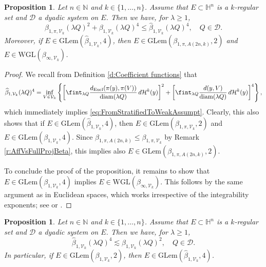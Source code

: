 \documentclass[12pt]{amsart}
\newcommand{\diam}{{\rm diam}}
\numberwithin{equation}{section}
\theoremstyle{plain}
\newtheorem{proposition}[theorem]{Proposition}
\theoremstyle{definition}
\theoremstyle{remark}
\begin{document}
\begin{proposition}\label{p:FromStratifiedToWeakAssumpt}
    Let $n\in \mathbb{N}$ and $k\in \{1,\ldots,n\}$. Assume that $E\subset \mathbb{H}^n$ is a $k$-regular set and $\mathcal{D}$ a dyadic system on $E$. Then we have, for $\lambda \geq 1$,
    \begin{equation}\label{eq:FromStratifiedToWeakAssumpt}
   \beta_{1,\pi,\mathcal{V}_k}(\lambda Q)^2 +\beta_{1,\mathcal{V}_k}(\lambda Q)^4 \leq      \widehat{\beta}_{1,\mathcal{V}_k}(\lambda Q)^4,\quad Q\in \mathcal{D}.
    \end{equation}
   Moreover, if $E\in \mathrm{GLem}(\widehat{\beta}_{1,\mathcal{V}_k},4)$, then $E\in \mathrm{GLem}(\beta_{1,\pi,A(2n,k)},2)$ and $E\in \mathrm{WGL}(\beta_{\infty,\mathcal{V}_k})$.
\end{proposition}


\begin{proof}
We recall from Definition \ref{d:Coefficient functions} that
\begin{displaymath}
    \widehat{\beta}_{1,\mathcal{V}_k}(\lambda Q)^4=\inf_{V\in\mathcal V_k}\left\{\left[\fint_{\lambda Q}\frac{d_{\mathrm{Eucl}}(\pi(y),\pi(V))}{\diam (\lambda Q)}\,d\mathcal{H}^k(y)\right]^{2}+\left[\fint_{\lambda Q}\frac{d(y,V)}{\diam (\lambda Q)}\,d\mathcal{H}^k(y)\right]^{4}\right\},
\end{displaymath}
which immediately implies \eqref{eq:FromStratifiedToWeakAssumpt}. Clearly, this also shows that if $E\in \mathrm{GLem}(\widehat{\beta}_{1,\mathcal{V}_k},4)$, then $E\in \mathrm{GLem}(\beta_{1,\pi,\mathcal{V}_k},2)$ and $E\in \mathrm{GLem}(\beta_{1,\mathcal{V}_k},4)$. Since $\beta_{1,\pi,A(2n,k)}\leq \beta_{1,\pi,\mathcal{V}_k}$ by Remark \ref{r:AffVsFullProjBeta}, this implies also  $E\in \mathrm{GLem}(\beta_{1,\pi,A(2n,k)},2)$.

To conclude the proof of the proposition, it remains to show that $E\in \mathrm{GLem}(\beta_{1,\mathcal{V}_k},4)$ implies $E\in \mathrm{WGL}(\beta_{\infty,\mathcal{V}_k})$. This follows by the same argument as in Euclidean spaces, which works irrespective of the integrability exponents; see \cite[p.27]{David1} or \cite[p.27]{David2}.
\end{proof}

\begin{proposition}\label{p:FromHorizToStartif}
    Let $n\in \mathbb{N}$ and $k\in \{1,\ldots,n\}$. Assume that $E\subset \mathbb{H}^n$ is a $k$-regular set and $\mathcal{D}$ a dyadic system on $E$. Then we have, for $\lambda \geq 1$,
    \begin{equation}\label{eq:FromStratifiedToWeakAssumpt1}
  \widehat{\beta}_{1,\mathcal{V}_k}(\lambda Q)^4 \lesssim \beta_{1,\mathcal{V}_k}(\lambda Q)^2,\quad Q\in \mathcal{D}.
    \end{equation}
In particular, if $E\in \mathrm{GLem}(\beta_{1,\mathcal{V}_k},2)$, then 
   $E\in \mathrm{GLem}(\widehat{\beta}_{1,\mathcal{V}_k},4)$.
\end{proposition}
\end{document}
